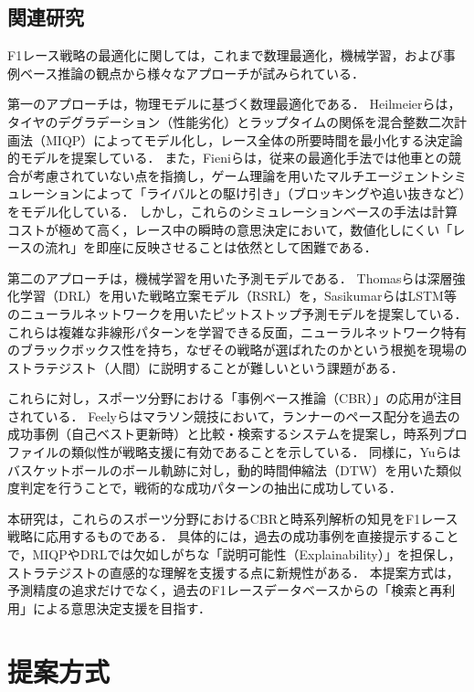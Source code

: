 \documentclass{deimj}
\begin{document}
\subsection{関連研究}

F1レース戦略の最適化に関しては，これまで数理最適化，機械学習，および事例ベース推論の観点から様々なアプローチが試みられている．

第一のアプローチは，物理モデルに基づく数理最適化である．
Heilmeierら\cite{Heilmeier2020}は，タイヤのデグラデーション（性能劣化）とラップタイムの関係を混合整数二次計画法（MIQP）によってモデル化し，レース全体の所要時間を最小化する決定論的モデルを提案している．
また，Fieniら\cite{Fieni2025}は，従来の最適化手法では他車との競合が考慮されていない点を指摘し，ゲーム理論を用いたマルチエージェントシミュレーションによって「ライバルとの駆け引き」（ブロッキングや追い抜きなど）をモデル化している． しかし，これらのシミュレーションベースの手法は計算コストが極めて高く，レース中の瞬時の意思決定において，数値化しにくい「レースの流れ」を即座に反映させることは依然として困難である．

第二のアプローチは，機械学習を用いた予測モデルである．
Thomasら\cite{Thomas2025}は深層強化学習（DRL）を用いた戦略立案モデル（RSRL）を，Sasikumarら\cite{Sasikumar2025}はLSTM等のニューラルネットワークを用いたピットストップ予測モデルを提案している．
これらは複雑な非線形パターンを学習できる反面，ニューラルネットワーク特有のブラックボックス性を持ち，なぜその戦略が選ばれたのかという根拠を現場のストラテジスト（人間）に説明することが難しいという課題がある．

これらに対し，スポーツ分野における「事例ベース推論（CBR）」の応用が注目されている．
Feelyら\cite{Feely2018}はマラソン競技において，ランナーのペース配分を過去の成功事例（自己ベスト更新時）と比較・検索するシステムを提案し，時系列プロファイルの類似性が戦略支援に有効であることを示している．
同様に，Yuら\cite{Yu2019}はバスケットボールのボール軌跡に対し，動的時間伸縮法（DTW）を用いた類似度判定を行うことで，戦術的な成功パターンの抽出に成功している．

本研究は，これらのスポーツ分野におけるCBRと時系列解析の知見をF1レース戦略に応用するものである．
具体的には，過去の成功事例を直接提示することで，MIQPやDRLでは欠如しがちな「説明可能性（Explainability）」を担保し，ストラテジストの直感的な理解を支援する点に新規性がある．
本提案方式は，予測精度の追求だけでなく，過去のF1レースデータベースからの「検索と再利用」による意思決定支援を目指す．

\section{提案方式}
\end{document}
